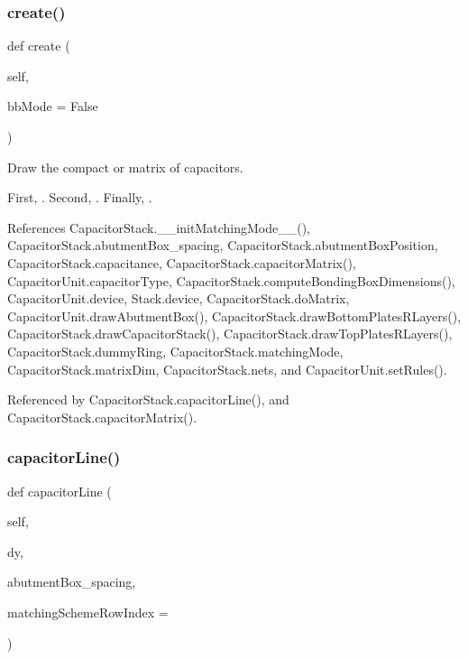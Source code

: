 \subsubsection{\texorpdfstring{create()}{create()}}
{\footnotesize\ttfamily def create (\begin{DoxyParamCaption}\item[{}]{self,  }\item[{}]{bb\+Mode = {\ttfamily False} }\end{DoxyParamCaption})}



Draw the compact or matrix of capacitors. 

First, . Second, . Finally, . 

References Capacitor\+Stack.\+\_\+\+\_\+init\+Matching\+Mode\+\_\+\+\_\+(), Capacitor\+Stack.\+abutment\+Box\+\_\+spacing, Capacitor\+Stack.\+abutment\+Box\+Position, Capacitor\+Stack.\+capacitance, Capacitor\+Stack.\+capacitor\+Matrix(), Capacitor\+Unit.\+capacitor\+Type, Capacitor\+Stack.\+compute\+Bonding\+Box\+Dimensions(), Capacitor\+Unit.\+device, Stack.\+device, Capacitor\+Stack.\+do\+Matrix, Capacitor\+Unit.\+draw\+Abutment\+Box(), Capacitor\+Stack.\+draw\+Bottom\+Plates\+R\+Layers(), Capacitor\+Stack.\+draw\+Capacitor\+Stack(), Capacitor\+Stack.\+draw\+Top\+Plates\+R\+Layers(), Capacitor\+Stack.\+dummy\+Ring, Capacitor\+Stack.\+matching\+Mode, Capacitor\+Stack.\+matrix\+Dim, Capacitor\+Stack.\+nets, and Capacitor\+Unit.\+set\+Rules().



Referenced by Capacitor\+Stack.\+capacitor\+Line(), and Capacitor\+Stack.\+capacitor\+Matrix().

\mbox{\label{classpython_1_1capacitormatrix_1_1CapacitorStack_a67f014dfa18e1ef67be992df3e731923}} 
\subsubsection{\texorpdfstring{capacitor\+Line()}{capacitorLine()}}
{\footnotesize\ttfamily def capacitor\+Line (\begin{DoxyParamCaption}\item[{}]{self,  }\item[{}]{dy,  }\item[{}]{abutment\+Box\+\_\+spacing,  }\item[{}]{matching\+Scheme\+Row\+Index = {} }\end{DoxyParamCaption})}



